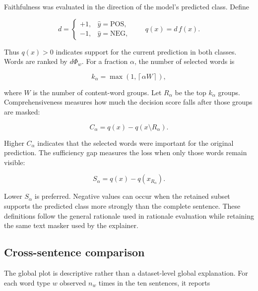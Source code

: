 \documentclass[11pt,a4paper]{article}
\begin{document}
Faithfulness was evaluated in the direction of the model's predicted class.
Define

\begin{equation}
  d=\begin{cases}
       +1, & \hat{y}=\mathrm{POS},\\
       -1, & \hat{y}=\mathrm{NEG},
     \end{cases}
  \qquad q(x)=d\,f(x).
  \label{eq:decision-score}
\end{equation}

Thus \(q(x)>0\) indicates support for the current prediction in both classes.
Words are ranked by \(d\Phi_w\). For a fraction \(\alpha\), the number of
selected words is

\begin{equation}
  k_{\alpha}=\max\!\left(1,\left\lceil \alpha W\right\rceil\right),
  \label{eq:selected-count}
\end{equation}

where \(W\) is the number of content-word groups. Let \(R_{\alpha}\) be the top
\(k_{\alpha}\) groups. Comprehensiveness measures how much the decision score
falls after those groups are masked:

\begin{equation}
  C_{\alpha}=q(x)-q\!\left(x\setminus R_{\alpha}\right).
  \label{eq:comprehensiveness}
\end{equation}

Higher \(C_{\alpha}\) indicates that the selected words were important for the
original prediction. The sufficiency gap measures the loss when only those words
remain visible:

\begin{equation}
  S_{\alpha}=q(x)-q\!\left(x_{R_{\alpha}}\right).
  \label{eq:sufficiency}
\end{equation}

Lower \(S_{\alpha}\) is preferred. Negative values can occur when the retained
subset supports the predicted class more strongly than the complete sentence.
These definitions follow the general rationale used in rationale evaluation
\cite{deyoung2020} while retaining the same text masker used by the explainer.

\subsection{Cross-sentence comparison}

The global plot is descriptive rather than a dataset-level global explanation.
For each word type \(w\) observed \(n_w\) times in the ten sentences, it reports
\end{document}
